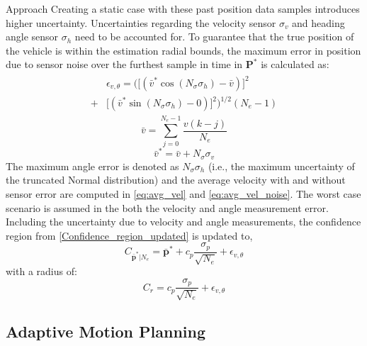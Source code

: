 \begin{section}{Approach}
Creating a static case with these past position data samples introduces higher uncertainty. Uncertainties regarding the velocity sensor $\sigma_v$ and heading angle sensor $\sigma_h$ need to be accounted for. To guarantee that the true position of the vehicle is within the estimation radial bounds, the maximum error in position due to sensor noise over the furthest sample in time in $\bm{P}^*$ is calculated as:
    \begin{align}
    \begin{split}
	&\epsilon_{v,\theta}=\Big( \big[(\bar{v}^* \cos(N_{\sigma}\sigma_h) - \bar{v}) \big]^2 \\
	+ & \big[ (\bar{v}^* \sin(N_{\sigma}\sigma_h) - 0) \big]^2 \Big) ^{1/2} (N_e-1)
	\end{split}
	\end{align}
    \begin{equation}
    \label{eq:avg_vel}
    \bar{v}=\sum_{j=0}^{N_e-1} \frac{v(k-j)}{N_e}
	\end{equation}
    \begin{equation}
    \label{eq:avg_vel_noise}
	\bar{v}^{*}=\bar{v}+N_{\sigma}\sigma_v 
	\end{equation}
The maximum angle error is denoted as $N_{\sigma}\sigma_h$ (i.e., the maximum uncertainty of the truncated Normal distribution) and the average velocity with and without sensor error are computed in \eqref{eq:avg_vel} and \eqref{eq:avg_vel_noise}. The worst case scenario is assumed in the both the velocity and angle measurement error. Including the uncertainty due to velocity and angle measurements, the confidence region from \eqref{Confidence_region_updated} is updated to,
    \begin{equation}
    \label{Confidence_region_updated2}
		C_{\bar{\bm{p}}^*|N_e} = \bar{\bm{p}}^* + c_p\frac{\sigma_p}{\sqrt{N_e}} + \epsilon_{v,\theta}
	\end{equation}
with a radius of:
    \begin{equation}
    \label{Confidence_radius2}
		C_r = c_p\frac{\sigma_p}{\sqrt{N_e}} + \epsilon_{v,\theta}
	\end{equation}

\subsection{Adaptive Motion Planning}


\end{section}
